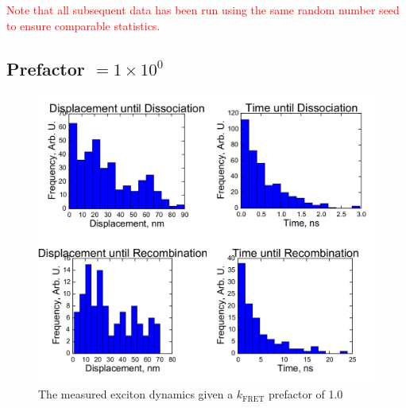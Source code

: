\documentclass[12pt]{article}
\begin{document}
\clearpage

\textcolor{red}{Note that all subsequent data has been run using the same random number seed to ensure comparable statistics.}

\subsection{Prefactor $= 1 \times 10^{0}$}

\begin{figure}[h!]\centering
	\includegraphics[width=\textwidth]{Figures/noPrefactor/noPrefactor.pdf}
    \caption{The measured exciton dynamics given a $k_{\text{FRET}}$ prefactor of 1.0}
	\label{fig:noPrefactor}
\end{figure}
\end{document}
